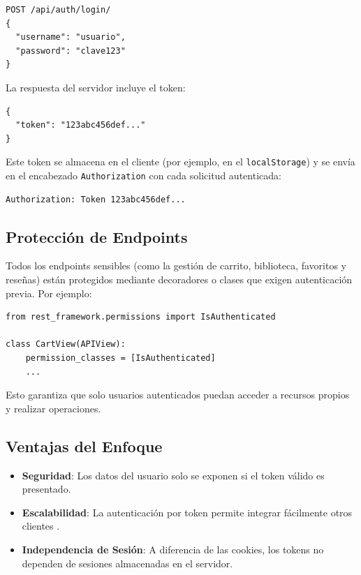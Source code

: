 \documentclass{article}
\begin{document}
\begin{verbatim}
POST /api/auth/login/
{
  "username": "usuario",
  "password": "clave123"
}
\end{verbatim}

La respuesta del servidor incluye el token:

\begin{verbatim}
{
  "token": "123abc456def..."
}
\end{verbatim}

Este token se almacena en el cliente (por ejemplo, en el \texttt{localStorage}) y se envía en el encabezado \texttt{Authorization} con cada solicitud autenticada:

\begin{verbatim}
Authorization: Token 123abc456def...
\end{verbatim}

\subsection{Protección de Endpoints}

Todos los endpoints sensibles (como la gestión de carrito, biblioteca, favoritos y reseñas) están protegidos mediante decoradores o clases que exigen autenticación previa. Por ejemplo:

\begin{verbatim}
from rest_framework.permissions import IsAuthenticated

class CartView(APIView):
    permission_classes = [IsAuthenticated]
    ...
\end{verbatim}

Esto garantiza que solo usuarios autenticados puedan acceder a recursos propios y realizar operaciones.

\subsection{Ventajas del Enfoque}

\begin{itemize}
    \item \textbf{Seguridad}: Los datos del usuario solo se exponen si el token válido es presentado.
    \item \textbf{Escalabilidad}: La autenticación por token permite integrar fácilmente otros clientes .
    \item \textbf{Independencia de Sesión}: A diferencia de las cookies, los tokens no dependen de sesiones almacenadas en el servidor.
\end{itemize}
\end{document}
